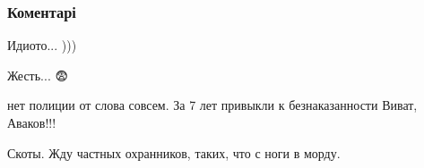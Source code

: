  
 
 
 
 
\subsubsection{Коментарі}

\begin{itemize}

 
Идиото... )))

 
Жесть... 😨

 
нет полиции от слова совсем. За 7 лет привыкли к безнаказанности Виват, Аваков!!!

 
Скоты. Жду частных охранников, таких, что с ноги в морду.

 

\end{itemize}

